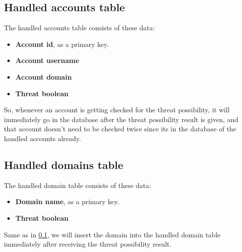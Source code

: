 \subsection{Handled accounts table}\label{ss:hand_acc}
The handled accounts table consists of these data:
\begin{itemize}
	\item \textbf{Account id}, as a primary key.
	\item \textbf{Account username}
	\item \textbf{Account domain}
	\item \textbf{Threat boolean}
\end{itemize}
So, whenever an account is getting checked for the threat possibility, it will immediately go in the database
after the threat possibility result is given, and that account doesn't need to be checked twice since its in the database
of the handled accounts already.
\subsection{Handled domains table}
The handled domain table consists of these data:
\begin{itemize}
	\item \textbf{Domain name}, as a primary key.
	\item \textbf{Threat boolean}
\end{itemize}
Same as in \ref{ss:hand_acc}, we will insert the domain into the handled domain table immediately after
receiving the threat possibility result.
